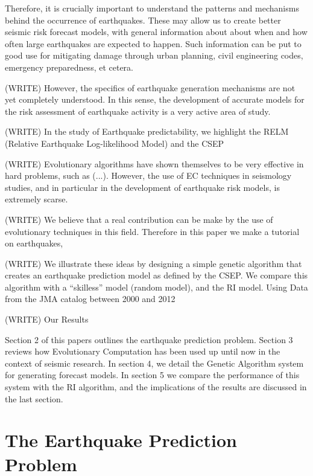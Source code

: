 \documentclass{sig-alternate}
\begin{document}
Therefore, it is crucially important to understand the patterns and
mechanisms behind the occurrence of earthquakes. These may allow us to
create better seismic risk forecast models, with general information
about about when and how often large earthquakes are expected to
happen. Such information can be put to good use for mitigating damage
through urban planning, civil engineering codes, emergency
preparedness, et cetera.

(WRITE) However, the specifics of earthquake generation mechanisms are not
yet completely understood. In this sense, the development of accurate
models for the risk assessment of earthquake activity is a very active
area of study.

(WRITE) In the study of Earthquake predictability, we highlight the RELM
(Relative Earthquake Log-likelihood Model) and the CSEP

(WRITE) Evolutionary algorithms have shown themselves to be very
effective in hard problems, such as (...). However, the use of EC
techniques in seismology studies, and in particular in the development
of earthquake risk models, is extremely scarse.

(WRITE) We believe that a real contribution can be make by the use of
evolutionary techniques in this field. Therefore in this paper we make
a tutorial on earthquakes,

(WRITE) We illustrate these ideas by designing a simple genetic algorithm
that creates an earthquake prediction model as defined by the CSEP. We
compare this algorithm with a ``skilless'' model (random model), and
the RI model. Using Data from the JMA catalog between 2000 and 2012

(WRITE) Our Results

Section 2 of this papers outlines the earthquake prediction
problem. Section 3 reviews how Evolutionary Computation has been used
up until now in the context of seismic research. In section 4, we
detail the Genetic Algorithm system for generating forecast models. In
section 5 we compare the performance of this system with the RI
algorithm, and the implications of the results are discussed in the
last section.

\section{The Earthquake Prediction Problem}
\end{document}
